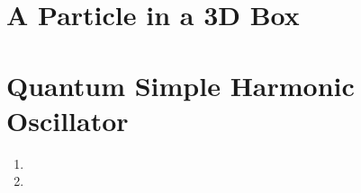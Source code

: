 \begin{enumerate}
    \section*{A Particle in a 3D Box}

    \section*{Quantum Simple Harmonic Oscillator}

    \begin{enumerate}

      \item 

      \item 

    \end{enumerate}

\end{enumerate}



